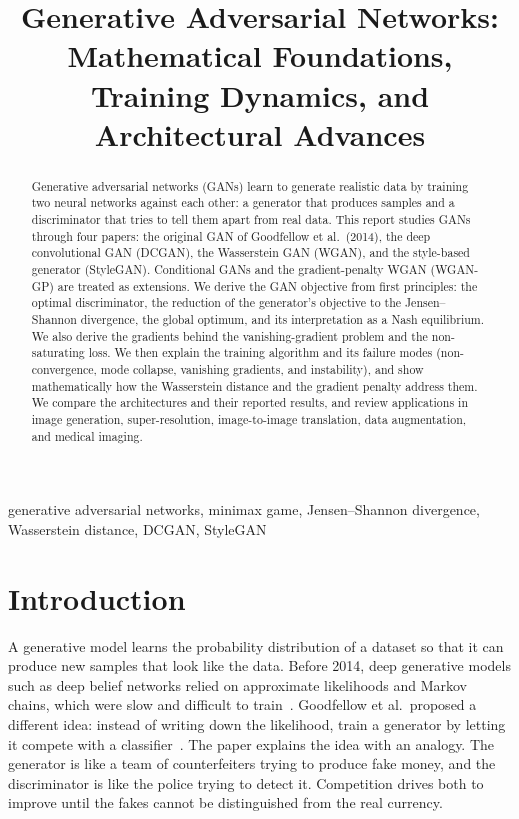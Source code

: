 \documentclass[conference]{IEEEtran}
\begin{document}
\title{Generative Adversarial Networks: Mathematical Foundations, Training Dynamics, and Architectural Advances}

\author{
}

\maketitle

\begin{abstract}
Generative adversarial networks (GANs) learn to generate realistic data by training two neural networks against each other: a generator that produces samples and a discriminator that tries to tell them apart from real data. This report studies GANs through four papers: the original GAN of Goodfellow et al.\ (2014), the deep convolutional GAN (DCGAN), the Wasserstein GAN (WGAN), and the style-based generator (StyleGAN). Conditional GANs and the gradient-penalty WGAN (WGAN-GP) are treated as extensions. We derive the GAN objective from first principles: the optimal discriminator, the reduction of the generator's objective to the Jensen--Shannon divergence, the global optimum, and its interpretation as a Nash equilibrium. We also derive the gradients behind the vanishing-gradient problem and the non-saturating loss. We then explain the training algorithm and its failure modes (non-convergence, mode collapse, vanishing gradients, and instability), and show mathematically how the Wasserstein distance and the gradient penalty address them. We compare the architectures and their reported results, and review applications in image generation, super-resolution, image-to-image translation, data augmentation, and medical imaging.
\end{abstract}

\begin{IEEEkeywords}
generative adversarial networks, minimax game, Jensen--Shannon divergence, Wasserstein distance, DCGAN, StyleGAN
\end{IEEEkeywords}

\section{Introduction}
A generative model learns the probability distribution of a dataset so that it can produce new samples that look like the data. Before 2014, deep generative models such as deep belief networks relied on approximate likelihoods and Markov chains, which were slow and difficult to train~\cite{goodfellow2014}. Goodfellow et al.\ proposed a different idea: instead of writing down the likelihood, train a generator by letting it compete with a classifier~\cite{goodfellow2014}. The paper explains the idea with an analogy. The generator is like a team of counterfeiters trying to produce fake money, and the discriminator is like the police trying to detect it. Competition drives both to improve until the fakes cannot be distinguished from the real currency.
\end{document}
